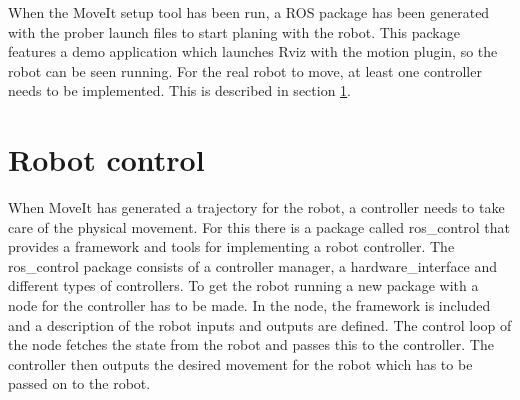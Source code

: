 When the MoveIt setup tool has been run, a ROS package has been generated with the prober launch files to start planing with the robot. This package features a demo application which launches Rviz with the motion plugin, so the robot can be seen running. For the real robot to move, at least one controller needs to be implemented. This is described in section \ref{sec:robot_control}.








\section{Robot control}
\label{sec:robot_control}
When MoveIt has generated a trajectory for the robot, a controller needs to take care of the physical movement. For this there is a package called ros\_control that provides a framework and tools for implementing a robot controller. The ros\_control package consists of a controller manager, a hardware\_interface and different types of controllers. To get the robot running a new package with a node for the controller has to be made. In the node, the framework is included and a description of the robot inputs and outputs are defined. The control loop of the node fetches the state from the robot and passes this to the controller. The controller then outputs the desired movement for the robot which has to be passed on to the robot.  




%
